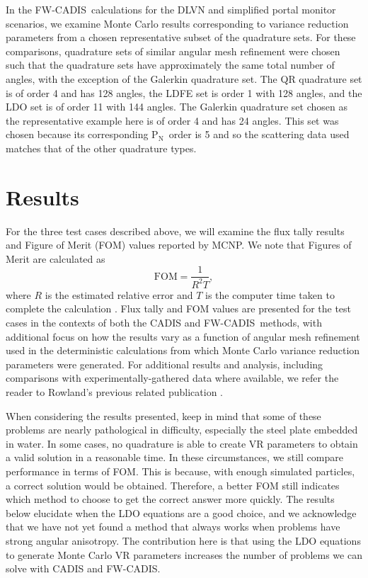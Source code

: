\documentclass{article} %
\newcommand{\pn}{P$_\mathrm{N}$}
\newcommand{\fwc}{\mbox{FW-CADIS}}
\begin{document}
In the \fwc\ calculations for the DLVN and simplified portal monitor
scenarios, we examine Monte Carlo results corresponding to variance reduction
parameters from a chosen representative subset of the quadrature sets. For
these comparisons, quadrature sets of similar angular mesh refinement were
chosen such that the quadrature sets have approximately the same total number
of angles, with the exception of the Galerkin quadrature set. The QR
quadrature set is of order 4 and has 128 angles, the LDFE set is order 1 with
128 angles, and the LDO set is of order 11 with 144 angles. The Galerkin
quadrature set chosen as the representative example here is of order 4 and has
24 angles. This set was chosen because its corresponding \pn\ order is 5 and
so the scattering data used matches that of the other quadrature types.

\section{Results}
\label{sec:results}

For the three test cases described above, we will examine the flux
tally results and Figure of Merit (FOM) values reported by MCNP. We note that
Figures of Merit are calculated as
%
\begin{equation}
\text{FOM} = \frac{1}{R^2T},
\label{eq:fom}
\end{equation}
%
where $R$ is the estimated relative error and $T$ is the computer time taken
to complete the calculation \cite{mcnp}. Flux tally and FOM values are
presented for the test cases in the contexts of both the CADIS and
\fwc\ methods, with additional focus on how the results vary as a function of
angular mesh refinement used in the deterministic calculations from which
Monte Carlo variance reduction parameters were generated. For additional
results and analysis, including comparisons with experimentally-gathered
data where available, we refer the reader to Rowland's previous related
publication \cite{kr}.

When considering the results presented, keep in mind that some of these
problems are nearly pathological in difficulty, especially the steel plate
embedded in water. In some cases, no quadrature is able to create VR
parameters to obtain a valid solution in a reasonable time. In these
circumstances, we still compare performance in terms of FOM. This
is because, with enough simulated particles, a correct solution would be obtained.
Therefore, a better FOM still indicates which method to choose to get
the correct answer more quickly. The results below elucidate when the LDO
equations are a good choice, and we acknowledge that we have not yet found a
method that always works when problems have strong angular anisotropy. The
contribution here is that using the LDO equations to generate Monte Carlo VR
parameters increases the number of problems we can solve with CADIS and \fwc.
\end{document}
